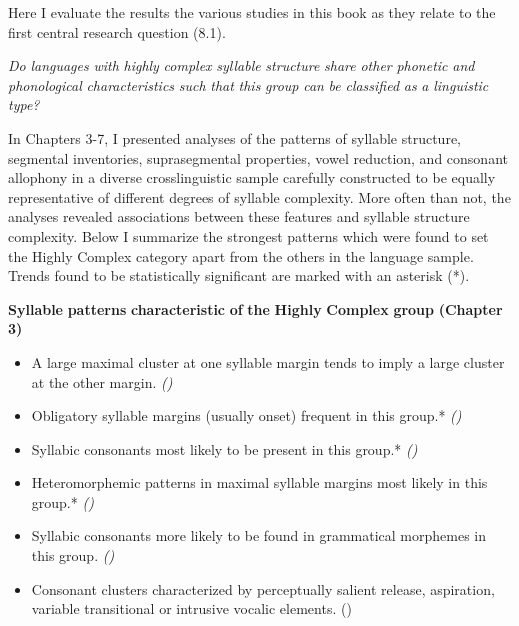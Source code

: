   Here I evaluate the results the various studies in this book as they relate to the first central research question (8.1).



\ea\label{ex:(8.1)}
   \textit{Do} \textit{languages} \textit{with} \textit{highly} \textit{complex} \textit{syllable} \textit{structure} \textit{share} \textit{other} \textit{phonetic} \textit{and} \textit{phonological} \textit{characteristics} \textit{such} \textit{that} \textit{this} \textit{group} \textit{can} \textit{be} \textit{classified} \textit{as} \textit{a} \textit{linguistic} \textit{type?}
\z



  In Chapters 3-7, I presented analyses of the patterns of syllable structure, segmental inventories, suprasegmental properties, vowel reduction, and consonant allophony in a diverse crosslinguistic sample carefully constructed to be equally representative of different degrees of syllable complexity. More often than not, the analyses revealed associations between these features and syllable structure complexity. Below I summarize the strongest patterns which were found to set the Highly Complex category apart from the others in the language sample. Trends found to be statistically significant are marked with an asterisk (*).



\textbf{Syllable} \textbf{patterns} \textbf{characteristic} \textbf{of} \textbf{the} \textbf{Highly} \textbf{Complex} \textbf{group} \textbf{(Chapter} \textbf{3)}


\begin{itemize}
\item 
A large maximal cluster at one syllable margin tends to imply a large cluster at the other margin. \textit{()}

\item 
Obligatory syllable margins (usually onset) frequent in this group.* \textit{()}

\item 
Syllabic consonants most likely to be present in this group.* \textit{()}

\item 
Heteromorphemic patterns in maximal syllable margins most likely in this group.* \textit{()}

\item 
Syllabic consonants more likely to be found in grammatical morphemes in this group. \textit{()}

\item 
Consonant clusters characterized by perceptually salient release, aspiration, variable transitional or intrusive vocalic elements. (\textit{})

\end{itemize}

